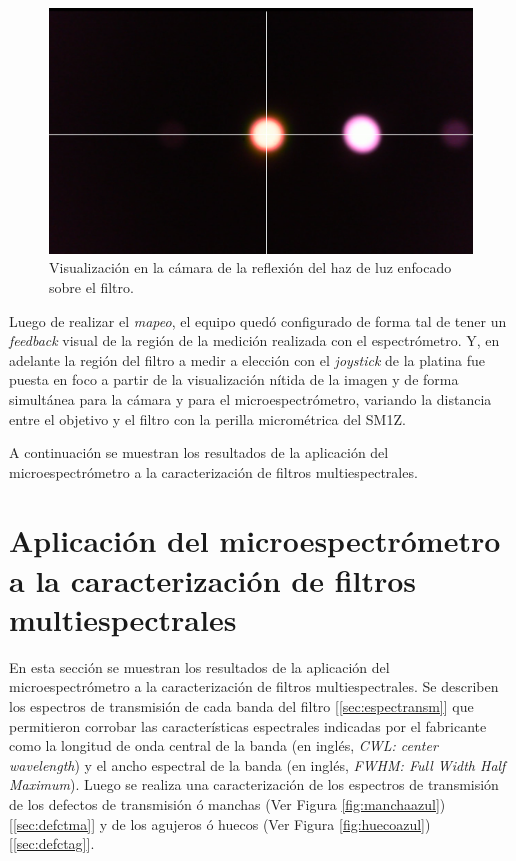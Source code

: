 \begin{figure}[H]
	\centering
	\includegraphics[scale=0.5]{Figs/microespectrometro/mapspectrometrocamera.png}
	\caption{Visualización en la cámara de la reflexión del haz de luz enfocado sobre el filtro.}
	\label{fig:refhazz}
\end{figure}

Luego de realizar el \textit{mapeo}, el equipo quedó configurado de forma tal de tener un \textit{feedback} visual de la región de la medición realizada con el espectrómetro. Y, en adelante la región del filtro a medir a elección con el \textit{joystick} de la platina fue puesta en foco a partir de la visualización nítida de la imagen y de forma simultánea para la cámara y para el microespectrómetro, variando la distancia entre el objetivo y el filtro con la perilla micrométrica del SM1Z.

A continuación se muestran los resultados de la aplicación del microespectrómetro a la caracterización de filtros multiespectrales.

\singlespacing
\section{Aplicación del microespectrómetro a la caracterización de filtros multiespectrales}
\label{sec:resgrales}

\hspace{0.5cm} En esta sección se muestran los resultados de la aplicación del microespectrómetro a la caracterización de filtros multiespectrales. Se describen los espectros de transmisión de cada banda del filtro [\ref{sec:espectransm}] que permitieron corrobar las características espectrales indicadas por el fabricante como la longitud de onda central de la banda (en inglés, \textit{CWL: center wavelength}) y el ancho espectral de la banda (en inglés, \textit{FWHM: Full Width Half Maximum}). Luego se realiza una caracterización de los espectros de transmisión de los defectos de transmisión ó manchas (Ver Figura \ref{fig:manchaazul}) [\ref{sec:defctma}] y de los agujeros ó huecos (Ver Figura \ref{fig:huecoazul}) [\ref{sec:defctag}].

